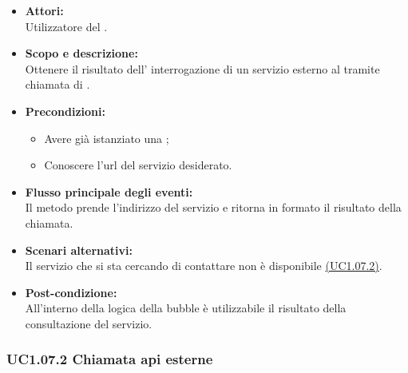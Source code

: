 \begin{itemize}
	\item \textbf{Attori:}
	\\Utilizzatore del .
	\item \textbf{Scopo e descrizione:} 
	\\Ottenere il risultato dell’ interrogazione di un servizio esterno al  tramite chiamata di .
	\item \textbf{Precondizioni:}
	\begin{itemize}
		\item Avere già istanziato una ;
		\item Conoscere l'url del servizio desiderato.
	\end{itemize}
	\item \textbf{Flusso principale degli eventi:}
	\\Il metodo prende l'indirizzo del servizio e ritorna in formato  il risultato della chiamata.
	\item \textbf{Scenari alternativi:}
	\\Il servizio che si sta cercando di contattare non è disponibile \hyperref[UC1.07.2]{(UC1.07.2)}.
	\item \textbf{Post-condizione:}
	\\All’interno della logica della bubble è utilizzabile il risultato della consultazione del servizio.
\end{itemize}

\subsubsection{UC1.07.2 Chiamata api esterne} \label{UC1.07.2}

